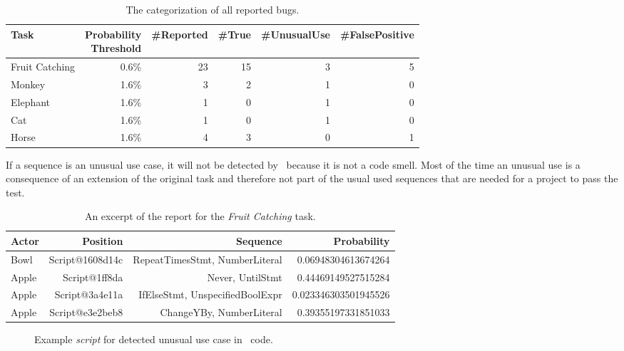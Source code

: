\begin{table}[hbtp]
    \centering
    \caption[The categorization of all reported bugs]{\label{tab:violations}The categorization of all reported bugs.}
    \begin{tabular}{lrrrrr}
        \toprule
        Task & \parbox[t]{2.2cm}{Probability\\Threshold} & \#Reported & \#True & \#UnusualUse & \#FalsePositive \\
        \midrule
        Fruit Catching & 0.6\% & 23 & 15 & 3 & 5 \\
        Monkey & 1.6\% & 3 & 2 & 1 & 0 \\
        Elephant & 1.6\% & 1 & 0 & 1 & 0 \\
        Cat & 1.6\% & 1 & 0 & 1 & 0 \\
        Horse & 1.6\% & 4 & 3 & 0 & 1 \\
        \bottomrule
    \end{tabular}
\end{table}

If a sequence is an unusual use case, it will not be detected by \litterbox\ because it is not a code smell. Most of the time an unusual use is a consequence of an extension of the original task and therefore not part of the usual used sequences that are needed for a project to pass the test. 

\begin{table}[hbtp]
    \centering
    \caption[An excerpt of the report for the \textit{Fruit Catching} task]{\label{tab:report}An excerpt of the report for the \textit{Fruit Catching} task.}
\begin{tabular}{lrrr}
        \toprule
        Actor & Position & Sequence & Probability\\
        \midrule
        Bowl & Script@1608d14c & RepeatTimesStmt, NumberLiteral & 0.06948304613674264 \\
	   Apple & Script@1ff8da & Never, UntilStmt & 0.44469149527515284 \\
	   Apple & Script@3a4e11a & IfElseStmt, UnspecifiedBoolExpr & 0.023346303501945526 \\
	   Apple & Script@e3e2beb8 & ChangeYBy, NumberLiteral & 0.39355197331851033 \\
        \bottomrule
    \end{tabular}
\end{table}

\begin{figure}[hbtp]%
    \centering
    \qquad
    \caption[Example \textit{script} for detected unusual use case in \scratch\ code]{\label{fig:unusualUse}Example \textit{script} for detected unusual use case in \scratch\ code.}%
\end{figure}

